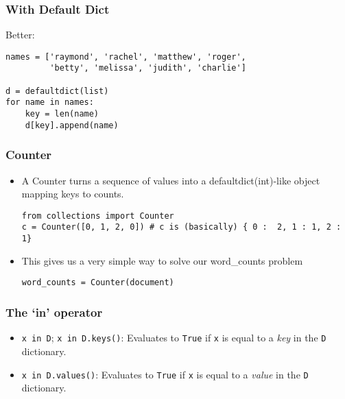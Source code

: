 \begin{frame}[fragile]\frametitle{With Default Dict}
Better:
\begin{lstlisting}
names = ['raymond', 'rachel', 'matthew', 'roger',
         'betty', 'melissa', 'judith', 'charlie']

d = defaultdict(list)
for name in names:
    key = len(name)
    d[key].append(name)
\end{lstlisting}
\end{frame}


\begin{frame}[fragile]\frametitle{Counter}
  \begin{itemize}
  \item A Counter turns a sequence of values into a defaultdict(int)-like object mapping keys to counts.	
  \begin{lstlisting}
from collections import Counter
c = Counter([0, 1, 2, 0]) # c is (basically) { 0 :	2, 1 : 1, 2 : 1}
  \end{lstlisting}
\item This gives us a very simple way to	solve our word\_counts problem
  \begin{lstlisting}
word_counts	= Counter(document)
  \end{lstlisting}
  \end{itemize}
\end{frame}



\begin{frame}[fragile]
  \frametitle{The `{\ttfamily\bfseries in}' operator}

  \begin{itemize}
  \item {\texttt{x in D}; \texttt{x in D.keys()}}: Evaluates to \texttt{True} if \texttt{x} is equal to a \emph{key}
    in the \texttt{D} dictionary.
  \item {\texttt{x in D.values()}}:  Evaluates to \texttt{True} if \texttt{x} is equal to a \emph{value}
    in the \texttt{D} dictionary.
  \end{itemize}

\end{frame}

